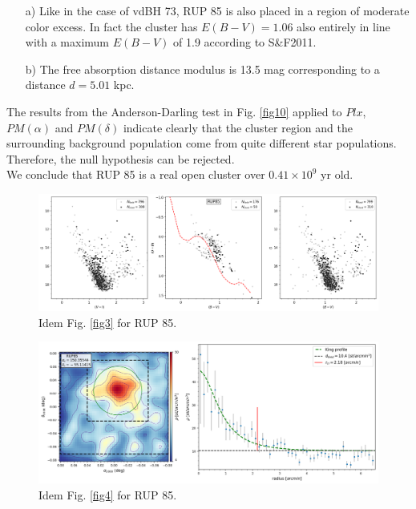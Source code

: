 \documentclass[draft]{aa}
\begin{document}
\begin{itemize}
\item [a)] Like in the case of vdBH 73, RUP 85 is also placed
    in a region of moderate color excess. In fact the cluster has $E(B-V) =
    1.06$ also entirely in line with a maximum $E(B-V)$ of 1.9 according to 
    S\&F2011.
\item [b)] The free absorption distance modulus is 13.5 mag corresponding to a
    distance $d=5.01$ kpc.
\end{itemize}

The results from the Anderson-Darling test in Fig. \ref{fig10} applied to $Plx$,
$PM(\alpha)$ and $PM(\delta)$ indicate clearly that the cluster region and the
surrounding background population come from quite different star populations.
Therefore, the null hypothesis can be rejected.\\

We conclude that RUP 85 is a real open cluster over $0.41\times10^9$ yr old.

\begin{figure}[ht]
    \centering
    \includegraphics[width=\hsize]{../figs/obs_RUP85.png}
    \caption{Idem Fig. \ref{fig3} for RUP 85.}
    \label{fig7}
\end{figure}

\begin{figure}[ht]
    \centering
    \includegraphics[width=\hsize]{../figs/dmap_rup85.png}
    \caption{Idem Fig. \ref{fig4} for RUP 85.}
    \label{fig8}
\end{figure}
\end{document}
